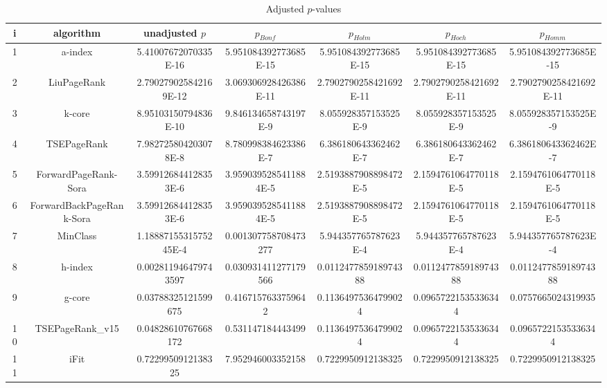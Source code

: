 \documentclass[a4paper,10pt]{article}
\begin{document}
\begin{landscape}
\begin{table}[!htp]
\centering\tiny
\caption{Adjusted $p$-values}
\begin{tabular}{ccccccc}
i&algorithm&unadjusted $p$&$p_{Bonf}$&$p_{Holm}$&$p_{Hoch}$&$p_{Homm}$\\
\hline
1&a-index&5.41007672070335E-16&5.951084392773685E-15&5.951084392773685E-15&5.951084392773685E-15&5.951084392773685E-15\\
2&LiuPageRank&2.790279025842169E-12&3.069306928426386E-11&2.7902790258421692E-11&2.7902790258421692E-11&2.7902790258421692E-11\\
3&k-core&8.95103150794836E-10&9.846134658743197E-9&8.055928357153525E-9&8.055928357153525E-9&8.055928357153525E-9\\
4&TSEPageRank&7.982725804203078E-8&8.780998384623386E-7&6.386180643362462E-7&6.386180643362462E-7&6.386180643362462E-7\\
5&ForwardPageRank-Sora&3.599126844128353E-6&3.9590395285411884E-5&2.5193887908898472E-5&2.1594761064770118E-5&2.1594761064770118E-5\\
6&ForwardBackPageRank-Sora&3.599126844128353E-6&3.9590395285411884E-5&2.5193887908898472E-5&2.1594761064770118E-5&2.1594761064770118E-5\\
7&MinClass&1.1888715531575245E-4&0.001307758708473277&5.944357765787623E-4&5.944357765787623E-4&5.944357765787623E-4\\
8&h-index&0.002811946479743597&0.030931411277179566&0.011247785918974388&0.011247785918974388&0.011247785918974388\\
9&g-core&0.03788325121599675&0.4167157633759642&0.11364975364799024&0.09657221535336344&0.0757665024319935\\
10&TSEPageRank_v15&0.04828610767668172&0.531147184443499&0.11364975364799024&0.09657221535336344&0.09657221535336344\\
11&iFit&0.7229950912138325&7.952946003352158&0.7229950912138325&0.7229950912138325&0.7229950912138325\\
\hline
\end{tabular}
\end{table}


\end{landscape}
\end{document}
